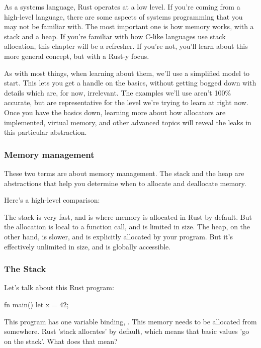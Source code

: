 As a systems language, Rust operates at a low level. If you're coming from a high-level language, there are some aspects of systems
programming that you may not be familiar with. The most important one is how memory works, with a stack and a heap. If you're familiar
with how C-like languages use stack allocation, this chapter will be a refresher. If you're not, you'll learn about this more general
concept, but with a Rust-y focus.

\blank

As with most things, when learning about them, we'll use a simplified model to start. This lets you get a handle on the basics, without
getting bogged down with details which are, for now, irrelevant. The examples we'll use aren't 100\% accurate, but are representative for
the level we're trying to learn at right now. Once you have the basics down, learning more about how allocators are implemented, virtual
memory, and other advanced topics will reveal the leaks in this particular abstraction.

\subsubsection*{Memory management}

These two terms are about memory management. The stack and the heap are abstractions that help you determine when to allocate and
deallocate memory.

\blank

Here's a high-level comparison:

\blank

The stack is very fast, and is where memory is allocated in Rust by default. But the allocation is local to a function call, and
is limited in size. The heap, on the other hand, is slower, and is explicitly allocated by your program. But it's effectively
unlimited in size, and is globally accessible.

\subsubsection*{The Stack}

Let's talk about this Rust program:

\begin{rustc}
fn main() {
    let x = 42;
}
\end{rustc}

This program has one variable binding, \x. This memory needs to be allocated from somewhere. Rust 'stack allocates' by default, which means that basic values 'go on the stack'. What does that mean?

